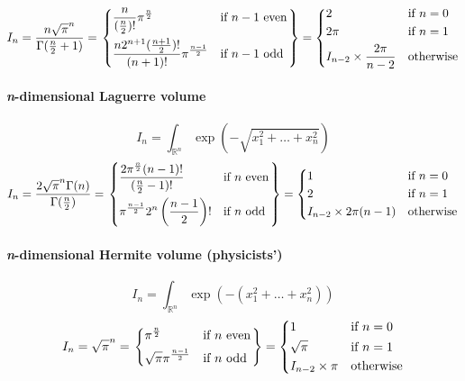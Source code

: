 \documentclass{scrartcl}
\begin{document}
\[
I_n
= \frac{n \sqrt{\pi}^n}{\Gamma(\frac{n}{2}+1)}
= \begin{rcases}\begin{dcases}
\frac{n}{(\frac{n}{2})!} \pi^{\frac{n}{2}}&\text{if $n-1$ even}\\
  \frac{n2^{n+1}(\frac{n+1}{2})!}{(n+1)!}\pi^{\frac{n-1}{2}}&\text{if $n-1$ odd}
\end{dcases}
\end{rcases}
= \begin{dcases}
  2&\text{if $n = 0$}\\
  2\pi&\text{if $n = 1$}\\
  I_{n-2} \times \frac{2\pi}{n - 2}&\text{otherwise}
\end{dcases}
\]


\paragraph{\textit{n}-dimensional Laguerre volume}

\[
  I_n = \int_{\mathbb{R}^n} \exp\left(-\sqrt{x_1^2+\dots+x_n^2}\right)
\]
\[
I_n
= \frac{2 \sqrt{\pi}^n \Gamma(n)}{\Gamma(\frac{n}{2})}
= \begin{rcases}\begin{dcases}
  \frac{2 \pi^{\frac{n}{2}} (n - 1)!}{(\frac{n}{2} - 1)!} &\text{if $n$ even}\\
  \pi^{\frac{n - 1}{2}} 2^n \left(\frac{n - 1}{2}\right)! &\text{if $n$ odd}
\end{dcases}
\end{rcases}
=\begin{dcases}
  1&\text{if $n=0$}\\
  2&\text{if $n=1$}\\
  I_{n-2} \times 2\pi(n-1)&\text{otherwise}
\end{dcases}
\]

\paragraph{\textit{n}-dimensional Hermite volume (physicists')}
\[
  I_n = \int_{\mathbb{R}^n} \exp\left(-(x_1^2+\dots+x_n^2)\right)
\]
\[
  I_n
  = \sqrt{\pi}^n
  = \begin{rcases}\begin{dcases}
     \pi^{\frac{n}{2}}&\text{if $n$ even}\\
     \sqrt{\pi} \pi^{\frac{n-1}{2}}&\text{if $n$ odd}
   \end{dcases}
   \end{rcases}
   =\begin{dcases}
     1&\text{if $n=0$}\\
     \sqrt{\pi}&\text{if $n=1$}\\
     I_{n-2} \times \pi&\text{otherwise}
   \end{dcases}
\]
\end{document}
